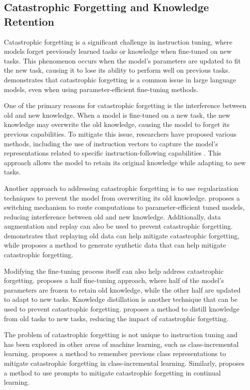 \documentclass[11pt]{article}
\begin{document}
\subsection{Catastrophic Forgetting and Knowledge Retention}

Catastrophic forgetting is a significant challenge in instruction tuning, where models forget previously learned tasks or knowledge when fine-tuned on new tasks. This phenomenon occurs when the model's parameters are updated to fit the new task, causing it to lose its ability to perform well on previous tasks. \cite{ref101} demonstrates that catastrophic forgetting is a common issue in large language models, even when using parameter-efficient fine-tuning methods.

One of the primary reasons for catastrophic forgetting is the interference between old and new knowledge. When a model is fine-tuned on a new task, the new knowledge may overwrite the old knowledge, causing the model to forget its previous capabilities. To mitigate this issue, researchers have proposed various methods, including the use of instruction vectors to capture the model's representations related to specific instruction-following capabilities \cite{ref102}. This approach allows the model to retain its original knowledge while adapting to new tasks.

Another approach to addressing catastrophic forgetting is to use regularization techniques to prevent the model from overwriting its old knowledge. \cite{ref103} proposes a switching mechanism to route computations to parameter-efficient tuned models, reducing interference between old and new knowledge. Additionally, data augmentation and replay can also be used to prevent catastrophic forgetting. \cite{ref104} demonstrates that replaying old data can help mitigate catastrophic forgetting, while \cite{ref105} proposes a method to generate synthetic data that can help mitigate catastrophic forgetting.

Modifying the fine-tuning process itself can also help address catastrophic forgetting. \cite{ref106} proposes a half fine-tuning approach, where half of the model's parameters are frozen to retain old knowledge, while the other half are updated to adapt to new tasks. Knowledge distillation is another technique that can be used to prevent catastrophic forgetting. \cite{ref107} proposes a method to distill knowledge from old tasks to new tasks, reducing the impact of catastrophic forgetting.

The problem of catastrophic forgetting is not unique to instruction tuning and has been explored in other areas of machine learning, such as class-incremental learning. \cite{ref108} proposes a method to remember previous class representations to mitigate catastrophic forgetting in class-incremental learning. Similarly, \cite{ref109} proposes a method to use prompts to mitigate catastrophic forgetting in continual learning.
\end{document}
